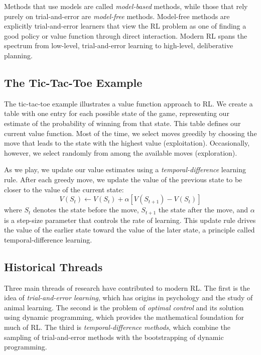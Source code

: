 \documentclass[12pt]{article}
\begin{document}
Methods that use models are called \textit{model-based} methods, while those that rely purely on trial-and-error are \textit{model-free} methods. Model-free methods are explicitly trial-and-error learners that view the RL problem as one of finding a good policy or value function through direct interaction. Modern RL spans the spectrum from low-level, trial-and-error learning to high-level, deliberative planning.

\subsection{The Tic-Tac-Toe Example}

The tic-tac-toe example illustrates a value function approach to RL. We create a table with one entry for each possible state of the game, representing our estimate of the probability of winning from that state. This table defines our current value function. Most of the time, we select moves greedily by choosing the move that leads to the state with the highest value (exploitation). Occasionally, however, we select randomly from among the available moves (exploration).

As we play, we update our value estimates using a \textit{temporal-difference} learning rule. After each greedy move, we update the value of the previous state to be closer to the value of the current state:
\begin{equation}
V(S_t) \leftarrow V(S_t) + \alpha[V(S_{t+1}) - V(S_t)]
\end{equation}
where $S_t$ denotes the state before the move, $S_{t+1}$ the state after the move, and $\alpha$ is a step-size parameter that controls the rate of learning. This update rule drives the value of the earlier state toward the value of the later state, a principle called temporal-difference learning.

\subsection{Historical Threads}

Three main threads of research have contributed to modern RL. The first is the idea of \textit{trial-and-error learning}, which has origins in psychology and the study of animal learning. The second is the problem of \textit{optimal control} and its solution using dynamic programming, which provides the mathematical foundation for much of RL. The third is \textit{temporal-difference methods}, which combine the sampling of trial-and-error methods with the bootstrapping of dynamic programming.
\end{document}
